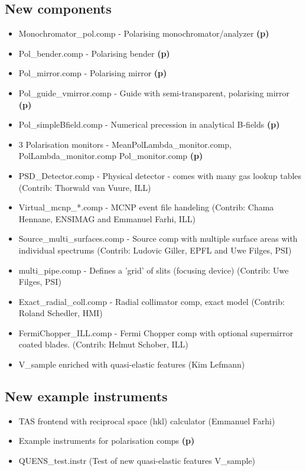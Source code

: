\subsection{New components}
\begin{itemize}
\item Monochromator\_pol.comp - Polarising monochromator/analyzer {\bf(p)}
\item Pol\_bender.comp - Polarising bender {\bf(p)}
\item Pol\_mirror.comp - Polarising mirror {\bf(p)}
\item Pol\_guide\_vmirror.comp - Guide with semi-transparent, polarising mirror {\bf(p)}
\item Pol\_simpleBfield.comp - Numerical precession in analytical B-fields {\bf(p)}
\item 3 Polarisation monitors - MeanPolLambda\_monitor.comp, PolLambda\_monitor.comp
    Pol\_monitor.comp {\bf(p)}
\item PSD\_Detector.comp - Physical detector - comes with many gas lookup tables
    (Contrib: Thorwald van Vuure, ILL)
\item Virtual\_mcnp\_*.comp - MCNP event file handeling
    (Contrib: Chama Hennane, ENSIMAG and Emmanuel Farhi, ILL)
\item Source\_multi\_surfaces.comp - Source comp with multiple surface areas with individual
    spectrums (Contrib: Ludovic Giller, EPFL and Uwe Filges, PSI)
\item multi\_pipe.comp - Defines a 'grid' of slits (focusing device)
    (Contrib: Uwe Filges, PSI)
\item Exact\_radial\_coll.comp - Radial collimator comp, exact model
    (Contrib: Roland Schedler, HMI)
\item FermiChopper\_ILL.comp  - Fermi Chopper comp with optional
  supermirror coated blades. (Contrib: Helmut Schober, ILL)
\item V\_sample enriched with quasi-elastic features (Kim Lefmann)
\end{itemize}
\subsection{New example instruments}
\begin{itemize}
\item TAS frontend with reciprocal space (hkl) calculator (Emmanuel Farhi)
\item Example instruments for polarisation comps {\bf(p)}
\item QUENS\_test.instr (Test of new quasi-elastic features V\_sample)
\end{itemize}
